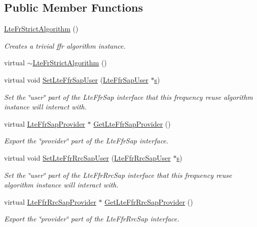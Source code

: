 \subsection*{Public Member Functions}
\begin{DoxyCompactItemize}
\item 
\hyperlink{classns3_1_1LteFrStrictAlgorithm_abd1822168a6ca294319f7c1d688d2f6b}{Lte\+Fr\+Strict\+Algorithm} ()
\begin{DoxyCompactList}\small\item\em Creates a trivial ffr algorithm instance. \end{DoxyCompactList}\item 
virtual \hyperlink{classns3_1_1LteFrStrictAlgorithm_a116c21ca1aae0d4d00a2c1a9ad9c4f83}{$\sim$\+Lte\+Fr\+Strict\+Algorithm} ()
\item 
virtual void \hyperlink{classns3_1_1LteFrStrictAlgorithm_a535018e45df652949b35d4617ee45720}{Set\+Lte\+Ffr\+Sap\+User} (\hyperlink{classns3_1_1LteFfrSapUser}{Lte\+Ffr\+Sap\+User} $\ast$\hyperlink{generate__test__data__lte__sinr_8m_ad83eeb3a142285d1243a08c6b7026df8}{s})
\begin{DoxyCompactList}\small\item\em Set the \char`\"{}user\char`\"{} part of the Lte\+Ffr\+Sap interface that this frequency reuse algorithm instance will interact with. \end{DoxyCompactList}\item 
virtual \hyperlink{classns3_1_1LteFfrSapProvider}{Lte\+Ffr\+Sap\+Provider} $\ast$ \hyperlink{classns3_1_1LteFrStrictAlgorithm_ac771711f6f70fe124d535c1a73db4154}{Get\+Lte\+Ffr\+Sap\+Provider} ()
\begin{DoxyCompactList}\small\item\em Export the \char`\"{}provider\char`\"{} part of the Lte\+Ffr\+Sap interface. \end{DoxyCompactList}\item 
virtual void \hyperlink{classns3_1_1LteFrStrictAlgorithm_afd52dc625a98d193ab1573fdd26ebe0c}{Set\+Lte\+Ffr\+Rrc\+Sap\+User} (\hyperlink{classns3_1_1LteFfrRrcSapUser}{Lte\+Ffr\+Rrc\+Sap\+User} $\ast$\hyperlink{generate__test__data__lte__sinr_8m_ad83eeb3a142285d1243a08c6b7026df8}{s})
\begin{DoxyCompactList}\small\item\em Set the \char`\"{}user\char`\"{} part of the Lte\+Ffr\+Rrc\+Sap interface that this frequency reuse algorithm instance will interact with. \end{DoxyCompactList}\item 
virtual \hyperlink{classns3_1_1LteFfrRrcSapProvider}{Lte\+Ffr\+Rrc\+Sap\+Provider} $\ast$ \hyperlink{classns3_1_1LteFrStrictAlgorithm_adccefb09c27081d39af9d50480134cc1}{Get\+Lte\+Ffr\+Rrc\+Sap\+Provider} ()
\begin{DoxyCompactList}\small\item\em Export the \char`\"{}provider\char`\"{} part of the Lte\+Ffr\+Rrc\+Sap interface. \end{DoxyCompactList}\end{DoxyCompactItemize}
